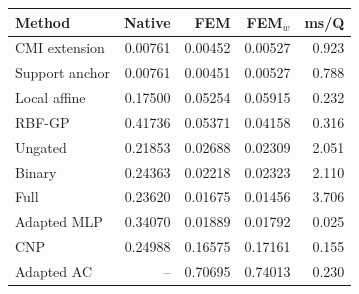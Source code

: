 \begin{tabular}{lrrrr}\toprule
Method & Native & FEM & FEM$_w$ & ms/Q\\\midrule
CMI extension & 0.00761 & 0.00452 & 0.00527 & 0.923\\
Support anchor & 0.00761 & 0.00451 & 0.00527 & 0.788\\
Local affine & 0.17500 & 0.05254 & 0.05915 & 0.232\\
RBF-GP & 0.41736 & 0.05371 & 0.04158 & 0.316\\
Ungated & 0.21853 & 0.02688 & 0.02309 & 2.051\\
Binary & 0.24363 & 0.02218 & 0.02323 & 2.110\\
Full & 0.23620 & 0.01675 & 0.01456 & 3.706\\
Adapted MLP & 0.34070 & 0.01889 & 0.01792 & 0.025\\
CNP & 0.24988 & 0.16575 & 0.17161 & 0.155\\
Adapted AC & -- & 0.70695 & 0.74013 & 0.230\\
\bottomrule\end{tabular}
